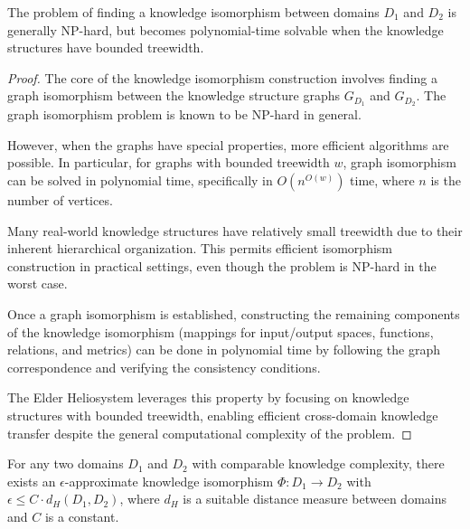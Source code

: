 \begin{theorem}
The problem of finding a knowledge isomorphism between domains $D_1$ and $D_2$ is generally NP-hard, but becomes polynomial-time solvable when the knowledge structures have bounded treewidth.
\end{theorem}

\begin{proof}
The core of the knowledge isomorphism construction involves finding a graph isomorphism between the knowledge structure graphs $G_{D_1}$ and $G_{D_2}$. The graph isomorphism problem is known to be NP-hard in general.

However, when the graphs have special properties, more efficient algorithms are possible. In particular, for graphs with bounded treewidth $w$, graph isomorphism can be solved in polynomial time, specifically in $O(n^{O(w)})$ time, where $n$ is the number of vertices.

Many real-world knowledge structures have relatively small treewidth due to their inherent hierarchical organization. This permits efficient isomorphism construction in practical settings, even though the problem is NP-hard in the worst case.

Once a graph isomorphism is established, constructing the remaining components of the knowledge isomorphism (mappings for input/output spaces, functions, relations, and metrics) can be done in polynomial time by following the graph correspondence and verifying the consistency conditions.

The Elder Heliosystem leverages this property by focusing on knowledge structures with bounded treewidth, enabling efficient cross-domain knowledge transfer despite the general computational complexity of the problem.
\end{proof}

\begin{theorem}
For any two domains $D_1$ and $D_2$ with comparable knowledge complexity, there exists an $\epsilon$-approximate knowledge isomorphism $\Phi: D_1 \to D_2$ with $\epsilon \leq C \cdot d_H(D_1, D_2)$, where $d_H$ is a suitable distance measure between domains and $C$ is a constant.
\end{theorem}

